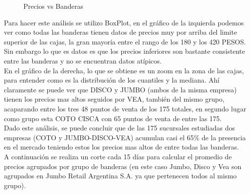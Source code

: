\begin{figure}[h]
\centering
{}%
\hspace{0.25cm}%
\caption{Precios vs Banderas}
\label{Precios_vs_Banderas}
\end{figure}


Para hacer este análisis se utilizo BoxPlot, en el gráfico de la izquierda podemos ver como todas las banderas tienen datos de precios muy por arriba del limite superior de las cajas, la gran mayoría entre el rango de los 180 y los 420 PESOS. Sin embargo lo que es datos es que los precios inferiores son bastante consistente entre las banderas y no se encuentran datos atípicos.\\
En el gráfico de la derecha, lo que se obtiene es un zoom en la zona de las cajas, para entender como es la distribución de los cuantiles y la mediana. Ahí claramente se puede ver que DISCO y JUMBO (ambos de la misma empresa) tienen los precios mas altos seguidos por VEA, también del mismo grupo, acaparando entre los tres 48 puntos de venta de los 175 totales, en segundo lugar como grupo esta COTO CISCA con 65 puntos de venta de entre las 175.\\
Dado este análisis, se puede concluir que de las 175 sucursales estudiadas dos empresas (COTO y JUMBO-DISCO-VEA) acumulan casi el 65\% de la presencia en el mercado teniendo estos los precios mas altos de entre todas las banderas.\\
\newpage
A continuación se realiza un corte cada 15 días para calcular el promedio de precios agrupados por grupo de banderas (en este caso Jumbo, Disco y Vea son agrupados en Jumbo Retail Argentina S.A. ya que pertenecen todos al mismo grupo).

